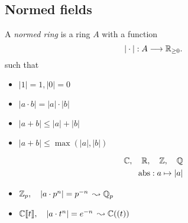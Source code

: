 \subsection{Normed fields} \label{sec:normed_fields}

\begin{frame}[fragile]
	\begin{minipage}[t]{.60\textwidth}
	\begin{definition}
		A \emph{normed ring} is a ring  $A$ with a function \[ 
			|\cdot |:A  \longrightarrow \mathbb R_{\ge 0}
		.\]
	such that 
	\begin{itemize}
		\item $|1| = 1, |0| = 0$
		\item $|a \cdot b| = |a | \cdot |b|$ 
		\item $|a + b| \le |a| + |b|$
	\end{itemize}

	\medskip

	\begin{itemize}
		\item<2-> $|a + b| \le \max(|a|, |b|)$
\end{itemize}
	\end{definition}
	\end{minipage}
	\;\;
	\begin{minipage}[t]{.35\textwidth}
		\begin{examples}
			\[
				\begin{aligned}
			\mathbb C,\quad \mathbb R,\quad \mathbb Z,\quad \mathbb Q\\
			\mathrm{abs}:a \mapsto |a|
				\end{aligned}
		\]

		\bigskip

		\begin{itemize}
				\item<2-> $\mathbb Z_p,\quad |a\cdot p^{n}| = p^{-n}$ $\leadsto \mathbb Q_p$
				\item<2-> $\mathbb C\llbracket t \rrbracket,\quad |a\cdot t ^{n}| = e^{-n}$ $\leadsto \mathbb C((t))$
		\end{itemize}	
	\end{examples}
	\end{minipage}
\end{frame}
